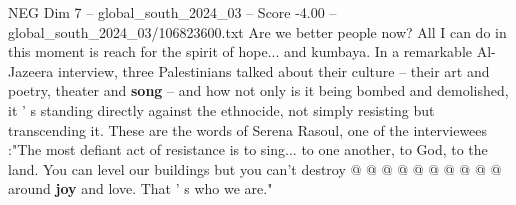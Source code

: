\begin{textsample}{NEG Dim 7 – global\_south\_2024\_03 – Score -4.00 – global\_south\_2024\_03/106823600.txt}
Are we better people now?
All I can do in this moment is reach for the spirit of hope... and kumbaya.
In a remarkable Al-Jazeera interview, three Palestinians talked about their culture -- their art and poetry, theater and \textbf{song} -- and how not only is it being bombed and demolished, it ' s standing directly against the ethnocide, not simply resisting but transcending it.
These are the words of Serena Rasoul, one of the interviewees :"The most defiant act of resistance is to sing... to one another, to God, to the land.
You can level our buildings but you can't destroy @ @ @ @ @ @ @ @ @ @ around \textbf{joy} and love.
That ' s who we are."

\end{textsample}
